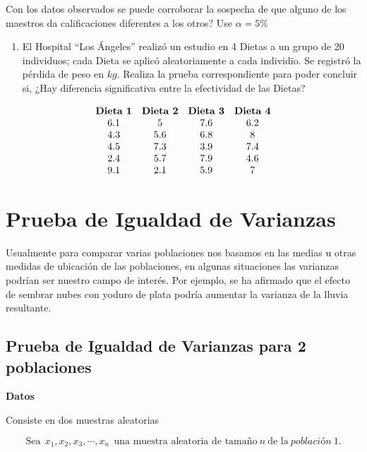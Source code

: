 \documentclass[
  a4paper,
  oneside,
  openany]{book}
\providecommand{\tightlist}{%
  \setlength{\itemsep}{0pt}\setlength{\parskip}{0pt}}
\begin{document}
Con los datos observados se puede corroborar la sospecha de que alguno de los maestros da calificaciones diferentes a los otros? Use \(\alpha=5\%\)

\begin{enumerate}
\def\labelenumi{\arabic{enumi}.}
\setcounter{enumi}{2}
\tightlist
\item
  El Hospital ``Los Ángeles'' realizó un estudio en 4 Dietas a un grupo de 20 individuos; cada Dieta se aplicó aleatoriamente a cada individio. Se registró la pérdida de peso en \(kg\).
  Realiza la prueba correspondiente para poder concluir si, ¿Hay diferencia significativa entre la efectividad de las Dietas?
\end{enumerate}

\[
\begin{array}{c c c c} 
\textbf{Dieta 1} & \textbf{Dieta 2} & \textbf{Dieta 3} & \textbf{Dieta 4}\\
6.1&5&7.6&6.2\\
4.3&5.6&6.8&8\\
4.5&7.3&3.9&7.4\\
2.4&5.7&7.9&4.6\\
9.1&2.1&5.9&7\\
\end{array}
\]

\hypertarget{prueba-de-igualdad-de-varianzas}{%
\chapter{Prueba de Igualdad de Varianzas}\label{prueba-de-igualdad-de-varianzas}}

Usualmente para comparar varias poblaciones nos basamos en las medias u otras medidas de ubicación de las poblaciones, en algunas situaciones las varianzas podrían ser nuestro campo de interés. Por ejemplo, se ha afirmado que el efecto de sembrar nubes con yoduro de plata podría aumentar la varianza de la lluvia resultante.

\hypertarget{prueba-de-igualdad-de-varianzas-para-2-poblaciones}{%
\section{Prueba de Igualdad de Varianzas para 2 poblaciones}\label{prueba-de-igualdad-de-varianzas-para-2-poblaciones}}

\textbf{Datos}

Consiste en dos muestras aleatorias

\[\mbox{Sea} \ \ x_{1},x_{2},x_{3},\cdots,x_{n} \ \ \mbox{una muestra aleatoria de tamaño} \  n  \ \mbox{de la} \ población \ 1.\]
\end{document}
